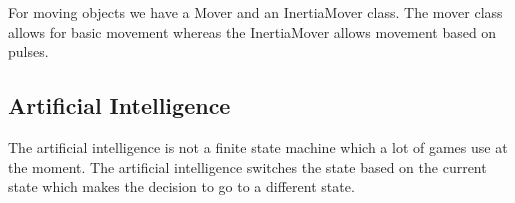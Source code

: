 \documentclass[acmtoplas,acmnow]{acmtrans2m}
\begin{document}
For moving objects we have a Mover and an InertiaMover class. The mover class allows for basic movement whereas the InertiaMover allows movement based on pulses.

\subsection{Artificial Intelligence}
The artificial intelligence is not a finite state machine which a lot of games use at the moment. The artificial intelligence switches the state based on the current state which makes the decision to go to a different state.

\begin{thebibliography}{}

\end{thebibliography}

\begin{received}
\end{received}
\end{document}
